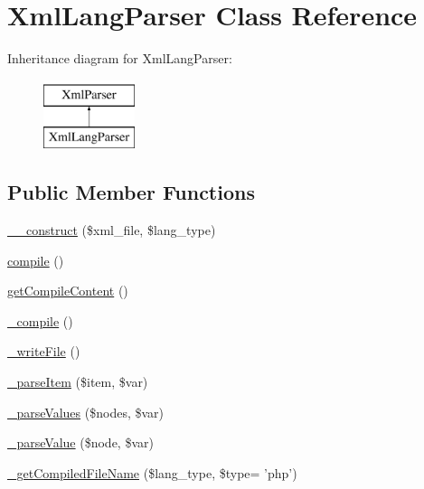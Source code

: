 \hypertarget{classXmlLangParser}{\section{Xml\-Lang\-Parser Class Reference}
\label{classXmlLangParser}
}
Inheritance diagram for Xml\-Lang\-Parser\-:\begin{figure}[H]
\begin{center}
\leavevmode
\includegraphics[height=2.000000cm]{classXmlLangParser}
\end{center}
\end{figure}
\subsection*{Public Member Functions}
\begin{DoxyCompactItemize}
\item 
\hyperlink{classXmlLangParser_a280e037da64b0878c55088d6649466fc}{\-\_\-\-\_\-construct} (\$xml\-\_\-file, \$lang\-\_\-type)
\item 
\hyperlink{classXmlLangParser_af0ffe6cf9e15d7af2ca16d5d9b7d5da1}{compile} ()
\item 
\hyperlink{classXmlLangParser_ab022a8d8d0717fbf4c8a171eaf6a54d2}{get\-Compile\-Content} ()
\item 
\hyperlink{classXmlLangParser_a6a27a9fbdd65d3ea3249120f8eb7d9c2}{\-\_\-compile} ()
\item 
\hyperlink{classXmlLangParser_ab49d81ff3d154da6c5d92f0367d33ec9}{\-\_\-write\-File} ()
\item 
\hyperlink{classXmlLangParser_a87379004e371e1812094e2bf802b274c}{\-\_\-parse\-Item} (\$item, \$var)
\item 
\hyperlink{classXmlLangParser_ac5ab3f7e29a914802e1b6144e6e8bcc5}{\-\_\-parse\-Values} (\$nodes, \$var)
\item 
\hyperlink{classXmlLangParser_a45b4e9645eb03c7ff7bdbda239148867}{\-\_\-parse\-Value} (\$node, \$var)
\item 
\hyperlink{classXmlLangParser_ab5049af4a722b0c2f7d8eed3c8c4dac0}{\-\_\-get\-Compiled\-File\-Name} (\$lang\-\_\-type, \$type= 'php')
\end{DoxyCompactItemize}
